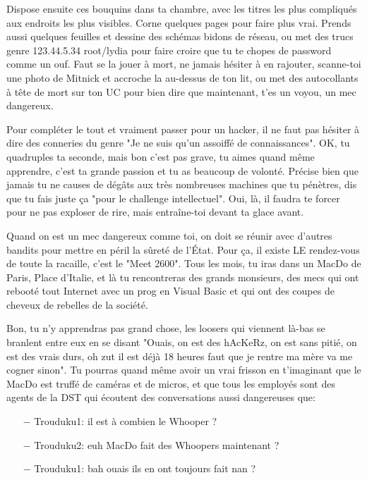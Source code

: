 	Dispose ensuite ces bouquins dans ta chambre, avec les titres les plus compliqués aux endroits les plus visibles. Corne quelques pages pour faire plus vrai. Prends aussi quelques feuilles et dessine des schémas bidons de réseau, ou met des trucs genre 123.44.5.34 root/lydia pour faire croire que tu te chopes de password comme un ouf. Faut se la jouer à mort, ne jamais hésiter à en rajouter, scanne-toi une photo de Mitnick et accroche la au-dessus de ton lit, ou met des autocollants à tête de mort sur ton UC pour bien dire que maintenant, t'es un voyou, un mec dangereux.
	
	Pour compléter le tout et vraiment passer pour un hacker, il ne faut pas hésiter à dire des conneries du genre "Je ne suis qu'un assoiffé de connaissances". OK, tu quadruples ta seconde, mais bon c'est pas grave, tu aimes quand même apprendre, c'est ta grande passion et tu as beaucoup de volonté. Précise bien que jamais tu ne causes de dégâts aux très nombreuses machines que tu pénètres, dis que tu fais juste ça "pour le challenge intellectuel". Oui, là, il faudra te forcer pour ne pas exploser de rire, mais entraîne-toi devant ta glace avant.
	
	Quand on est un mec dangereux comme toi, on doit se réunir avec d'autres bandits pour mettre en péril la sûreté de l'État. Pour ça, il existe LE rendez-vous de toute la racaille, c'est le "Meet 2600". Tous les mois, tu iras dans un MacDo de Paris, Place d'Italie, et là tu rencontreras des grands monsieurs, des mecs qui ont rebooté tout Internet avec un prog en Visual Basic et qui ont des coupes de cheveux de rebelles de la société.
	
	Bon, tu n'y apprendras pas grand chose, les loosers qui viennent là-bas se branlent entre eux en se disant "Ouais, on est des hAcKeRz, on est sans pitié, on est des vrais durs, oh zut il est déjà 18 heures faut que je rentre ma mère va me cogner sinon". Tu pourras quand même avoir un vrai frisson en t'imaginant que le MacDo est truffé de caméras et de micros, et que tous les employés sont des agents de la DST qui écoutent des conversations aussi dangereuses que:
	
	\begin{itemize}
		\item[$-$] Trouduku1: il est à combien le Whooper ?
		\item[$-$] Trouduku2: euh MacDo fait des Whoopers maintenant ?
		\item[$-$] Trouduku1: bah ouais ils en ont toujours fait nan ? 
	\end{itemize}
	
